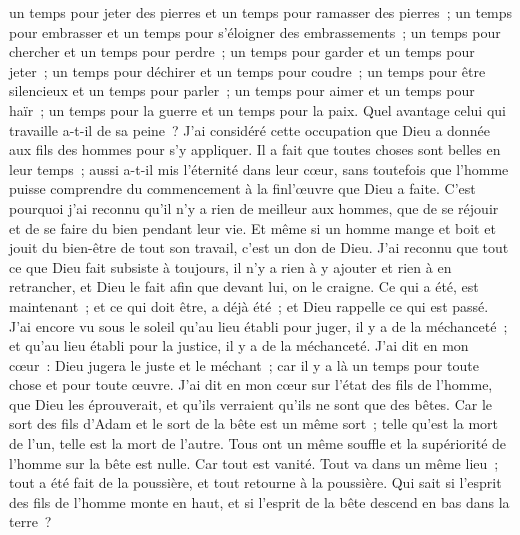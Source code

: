 \begin{multicols}{2}
un temps pour jeter des pierres et un temps pour ramasser des pierres~; un temps pour embrasser et un temps pour s'éloigner des embrassements~;
un temps pour chercher et un temps pour perdre~; un temps pour garder et un temps pour jeter~;
un temps pour déchirer et un temps pour coudre~; un temps pour être silencieux et un temps pour parler~;
un temps pour aimer et un temps pour haïr~; un temps pour la guerre et un temps pour la paix.
Quel avantage celui qui travaille a-t-il de sa peine~?
J'ai considéré cette occupation que Dieu a donnée aux fils des hommes pour s'y appliquer.
Il a fait que toutes choses sont belles en leur temps~; aussi a-t-il mis l'éternité dans leur cœur, sans toutefois que l'homme puisse comprendre du commencement à la finl'œuvre que Dieu a faite. 
C'est pourquoi j'ai reconnu qu'il n'y a rien de meilleur aux hommes, que de se réjouir et de se faire du bien pendant leur vie. 
Et même si un homme mange et boit et jouit du bien-être de tout son travail, c'est un don de Dieu.
J'ai reconnu que tout ce que Dieu fait subsiste à toujours, il n'y a rien à y ajouter et rien à en retrancher, et Dieu le fait afin que devant lui, on le craigne.
Ce qui a été, est maintenant~; et ce qui doit être, a déjà été~; et Dieu rappelle ce qui est passé.
J'ai encore vu sous le soleil qu'au lieu établi pour juger, il y a de la méchanceté~; et qu'au lieu établi pour la justice, il y a de la méchanceté.
J'ai dit en mon cœur~: Dieu jugera le juste et le méchant~; car il y a là un temps pour toute chose et pour toute œuvre.
J'ai dit en mon cœur sur l'état des fils de l'homme, que Dieu les éprouverait, et qu'ils verraient qu'ils ne sont que des bêtes.
Car le sort des fils d'Adam et le sort de la bête est un même sort~; telle qu'est la mort de l'un, telle est la mort de l'autre. Tous ont un même souffle et la supériorité de l'homme sur la bête est nulle. Car tout est vanité.
Tout va dans un même lieu~; tout a été fait de la poussière, et tout retourne à la poussière.
Qui sait si l'esprit des fils de l'homme monte en haut, et si l'esprit de la bête descend en bas dans la terre~?

\end{multicols}
